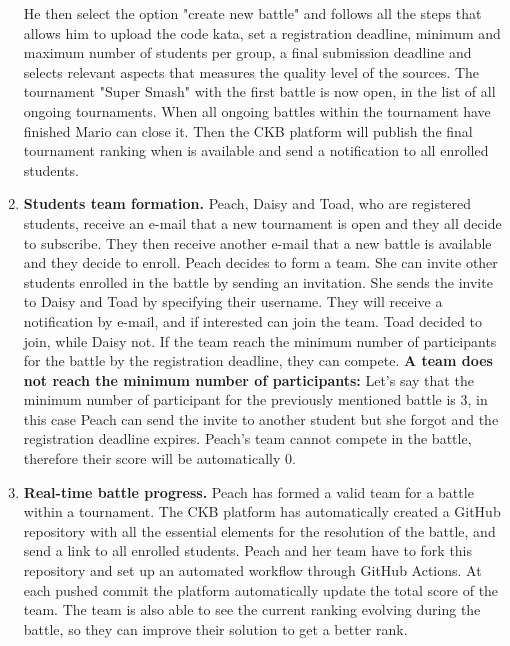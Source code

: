 \begin{enumerate}[label=\textbf{SC.\arabic*}]
    He then select the option "create new battle" and follows all the steps that allows him to upload the code kata, set a registration deadline, minimum and maximum number of students per group, a final submission deadline and selects relevant aspects that measures the quality level of the sources.
    The tournament "Super Smash" with the first battle is now open, in the list of all ongoing tournaments. \newline
    When all ongoing battles within the tournament have finished Mario can close it. Then the CKB platform will publish the final tournament ranking when is available and send a notification to all enrolled students.
    \item {} \textbf{Students team formation.} \newline
    Peach, Daisy and Toad, who are registered students, receive an e-mail that a new tournament is open and they all decide to subscribe. They then receive another e-mail that a new battle is available and they decide to enroll. \newline
    Peach decides to form a team. She can invite other students enrolled in the battle by sending an invitation. She sends the invite to Daisy and Toad by specifying their username. They will receive a notification by e-mail, and if interested can join the team. Toad decided to join, while Daisy not. \newline
    If the team reach the minimum number of participants for the battle by the registration deadline, they can compete. \newline
    \textbf{A team does not reach the minimum number of participants:} Let's say that the minimum number of participant for the  previously mentioned battle is 3, in this case Peach can send the invite to another student but she forgot and the registration deadline expires.
    Peach's team cannot compete in the battle, therefore their score will be automatically 0.
    \item {} \textbf{Real-time battle progress.} \newline
    Peach has formed a valid team for a battle within a tournament. The CKB platform has automatically created a GitHub repository with all the essential elements for the resolution of the battle, and send a link to all enrolled students.
    Peach and her team have to fork this repository and set up an automated workflow through GitHub Actions. At each pushed commit the platform automatically update the total score of the team. The team is also able to see the current ranking evolving during the battle, so they can improve their solution to get a better rank.\newline

\end{enumerate}
